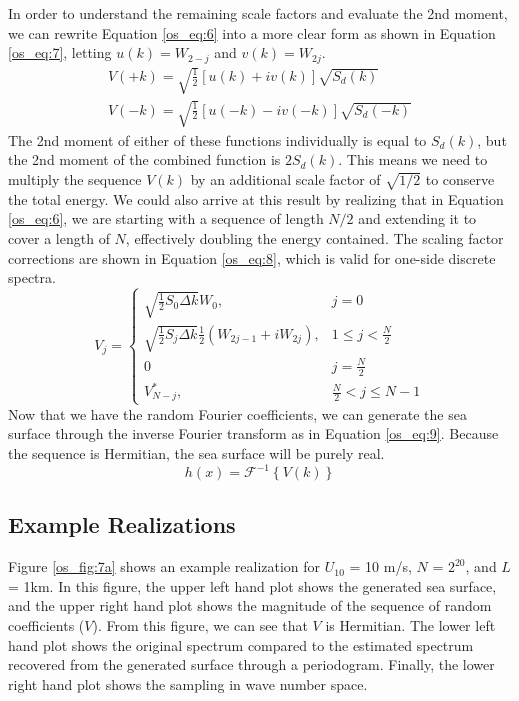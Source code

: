In order to understand the remaining scale factors and evaluate the 2nd moment, we can rewrite Equation \ref{os_eq:6} into a more clear form as shown in Equation \ref{os_eq:7}, letting $u(k) = W_{2-j}$ and $v(k) = W_{2j}$.
\begin{equation}
  \begin{gathered}
  \label{os_eq:7}
  V(+k) = \sqrt{\frac{1}{2}}\left[u(k) + iv(k) \right]\sqrt{S_d(k)} \\
  V(-k) = \sqrt{\frac{1}{2}}\left[u(-k) - iv(-k) \right]\sqrt{S_d(-k)}
  \end{gathered}
\end{equation}
The 2nd moment of either of these functions individually is equal to $S_d(k)$, but the 2nd moment of the combined function is $2S_d(k)$. This means we need to multiply the sequence $V(k)$ by an additional scale factor of $\sqrt{1/2}$ to conserve the total energy. We could also arrive at this result by realizing that in Equation \ref{os_eq:6}, we are starting with a sequence of length $N/2$ and extending it to cover a length of $N$, effectively doubling the energy contained. The scaling factor corrections are shown in Equation \ref{os_eq:8}, which is valid for one-side discrete spectra.
\begin{equation}
  \label{os_eq:8}   
  V_j = \begin{cases}
    \sqrt{\frac{1}{2}S_0\Delta k}W_0, & j = 0 \\
    \sqrt{\frac{1}{2}S_j\Delta k}\frac{1}{2}\left(W_{2j-1} + iW_{2j} \right), & 1 \leq j < \frac{N}{2} \\
    0 & j = \frac{N}{2} \\
    V_{N-j}^*, &  \frac{N}{2} < j \leq N-1 
  \end{cases} 
\end{equation}
Now that we have the random Fourier coefficients, we can generate the sea surface through the inverse Fourier transform as in Equation \ref{os_eq:9}. Because the sequence is Hermitian, the sea surface will be purely real.
\begin{equation}
  \label{os_eq:9}
  h(x) = \mathcal{F}^{-1}\left\{V(k) \right\}
  \end{equation}

\subsection{Example Realizations}
Figure \ref{os_fig:7a} shows an example realization for $U_{10}$ = 10 m/s, $N$ = $2^{20}$, and $L$ = 1km. In this figure, the upper left hand plot shows the generated sea surface, and the upper right hand plot shows the magnitude of the sequence of random coefficients ($V$). From this figure, we can see that $V$ is Hermitian. The lower left hand plot shows the original spectrum compared to the estimated spectrum recovered from the generated surface through a periodogram. Finally, the lower right hand plot shows the sampling in wave number space.


